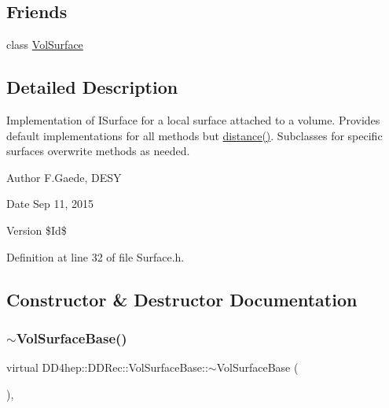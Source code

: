 \subsection*{Friends}
\begin{DoxyCompactItemize}
\item 
class \hyperlink{class_d_d4hep_1_1_d_d_rec_1_1_vol_surface_base_aac662841c478da205fce85f4b5b036f2}{Vol\+Surface}
\end{DoxyCompactItemize}


\subsection{Detailed Description}
Implementation of I\+Surface for a local surface attached to a volume. Provides default implementations for all methods but \hyperlink{class_d_d4hep_1_1_d_d_rec_1_1_vol_surface_base_aefb278e0429219871c47b602a2593fef}{distance()}. Subclasses for specific surfaces overwrite methods as needed.

\begin{DoxyAuthor}{Author}
F.\+Gaede, D\+E\+SY 
\end{DoxyAuthor}
\begin{DoxyDate}{Date}
Sep 11, 2015 
\end{DoxyDate}
\begin{DoxyVersion}{Version}
\$\+Id\$ 
\end{DoxyVersion}


Definition at line 32 of file Surface.\+h.



\subsection{Constructor \& Destructor Documentation}
\hypertarget{class_d_d4hep_1_1_d_d_rec_1_1_vol_surface_base_a675e603aff05bfb6f75fac1929f2b8df}{}\label{class_d_d4hep_1_1_d_d_rec_1_1_vol_surface_base_a675e603aff05bfb6f75fac1929f2b8df} 
\subsubsection{\texorpdfstring{$\sim$\+Vol\+Surface\+Base()}{~VolSurfaceBase()}}
{\footnotesize\ttfamily virtual D\+D4hep\+::\+D\+D\+Rec\+::\+Vol\+Surface\+Base\+::$\sim$\+Vol\+Surface\+Base (\begin{DoxyParamCaption}{ }\end{DoxyParamCaption})\hspace{0.3cm}{\ttfamily [inline]}, {\ttfamily [virtual]}}



